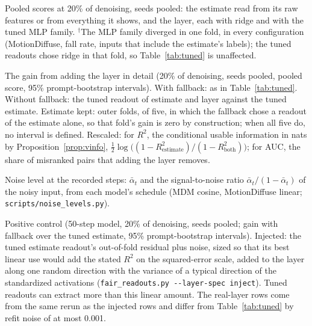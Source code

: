 \begin{table}[h]
\centering
\caption{Pooled scores at 20\% of denoising, seeds pooled: the estimate read from its raw features or from everything it shows, and the layer, each with ridge and with the tuned MLP family. $^\dagger$The MLP family diverged in one fold, in every configuration (MotionDiffuse, fall rate, inputs that include the estimate's labels); the tuned readouts chose ridge in that fold, so Table~\ref{tab:tuned} is unaffected.}
\label{tab:raw}
\resizebox{\linewidth}{!}{}
\end{table}

\begin{table}[h]
\centering
\caption{The gain from adding the layer in detail (20\% of denoising, seeds pooled, pooled score, 95\% prompt-bootstrap intervals). With fallback: as in Table~\ref{tab:tuned}. Without fallback: the tuned readout of estimate and layer against the tuned estimate. Estimate kept: outer folds, of five, in which the fallback chose a readout of the estimate alone, so that fold's gain is zero by construction; when all five do, no interval is defined. Rescaled: for $R^2$, the conditional usable information in nats by Proposition~\ref{prop:vinfo}, $\tfrac12 \log\big((1 - R^2_{\text{estimate}})/(1 - R^2_{\text{both}})\big)$; for AUC, the share of misranked pairs that adding the layer removes.}
\label{tab:gaindetail}
\resizebox{\linewidth}{!}{}
\end{table}

\begin{table}[h]
\centering
\caption{Noise level at the recorded steps: $\bar\alpha_t$ and the signal-to-noise ratio $\bar\alpha_t / (1 - \bar\alpha_t)$ of the noisy input, from each model's schedule (MDM cosine, MotionDiffuse linear; \texttt{scripts/noise\_levels.py}).}
\label{tab:snr}

\end{table}

\begin{table}[h]
\centering
\caption{Positive control (50-step model, 20\% of denoising, seeds pooled; gain with fallback over the tuned estimate, 95\% prompt-bootstrap intervals). Injected: the tuned estimate readout's out-of-fold residual plus noise, sized so that its best linear use would add the stated $R^2$ on the squared-error scale, added to the layer along one random direction with the variance of a typical direction of the standardized activations (\texttt{fair\_readouts.py -{}-layer-spec inject}). Tuned readouts can extract more than this linear amount. The real-layer rows come from the same rerun as the injected rows and differ from Table~\ref{tab:tuned} by refit noise of at most 0.001.}
\label{tab:control}
\resizebox{\linewidth}{!}{}
\end{table}

